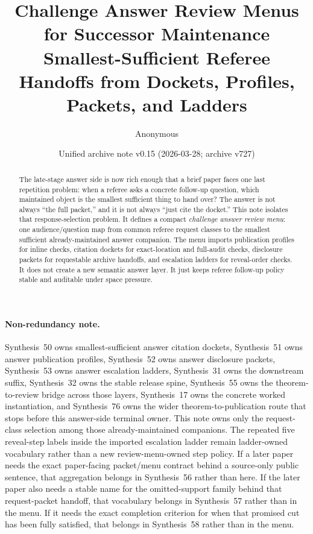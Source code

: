 \documentclass[11pt]{article}
\title{Challenge Answer Review Menus for Successor Maintenance\\\large Smallest-Sufficient Referee Handoffs from Dockets, Profiles, Packets, and Ladders}
\author{Anonymous}
\date{Unified archive note v0.15 (2026-03-28; archive v727)}
\begin{document}
\maketitle

\begin{abstract}
The late-stage answer side is now rich enough that a brief paper faces one last repetition problem: when a referee asks a concrete follow-up question, which maintained object is the smallest sufficient thing to hand over? The answer is not always ``the full packet,'' and it is not always ``just cite the docket.'' This note isolates that response-selection problem. It defines a compact \emph{challenge answer review menu}: one audience/question map from common referee request classes to the smallest sufficient already-maintained answer companion. The menu imports publication profiles for inline checks, citation dockets for exact-location and full-audit checks, disclosure packets for requestable archive handoffs, and escalation ladders for reveal-order checks. It does not create a new semantic answer layer. It just keeps referee follow-up policy stable and auditable under space pressure.
\end{abstract}

\paragraph{Non-redundancy note.}
Synthesis~50 owns smallest-sufficient answer citation dockets, Synthesis~51 owns answer publication profiles, Synthesis~52 owns answer disclosure packets, Synthesis~53 owns answer escalation ladders, Synthesis~31 owns the downstream suffix, Synthesis~32 owns the stable release spine, Synthesis~55 owns the theorem-to-review bridge across those layers, Synthesis~17 owns the concrete worked instantiation, and Synthesis~76 owns the wider theorem-to-publication route that stops before this answer-side terminal owner.\cite{series:challengeanswercitationdockets,series:challengeanswerpublicationprofiles,series:challengeanswerdisclosurepackets,series:challengeanswerescalationladders,series:downstreamnormalforms,series:releasespine,series:seriesspines,series:workedexample,series:theoremtopublicationspine}
This note owns only the request-class selection among those already-maintained companions. The repeated five reveal-step labels inside the imported escalation ladder remain ladder-owned vocabulary rather than a new review-menu-owned step policy. If a later paper needs the exact paper-facing packet/menu contract behind a source-only public sentence, that aggregation belongs in Synthesis~56 rather than here. If the later paper also needs a stable name for the omitted-support family behind that request-packet handoff, that vocabulary belongs in Synthesis~57 rather than in the menu. If it needs the exact completion criterion for when that promised cut has been fully satisfied, that belongs in Synthesis~58 rather than in the menu.\cite{series:publicrequestcontracts,series:requestableevidenceclasses,series:requestfulfillmentcertificates}
\end{document}
